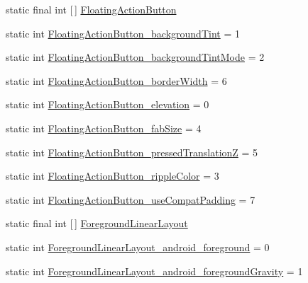 \begin{DoxyCompactItemize}
static final int \mbox{[}$\,$\mbox{]} \hyperlink{classandroid_1_1support_1_1v7_1_1mediarouter_1_1R_1_1styleable_ae665bad1758a0b708ec034929b76af91}{Floating\+Action\+Button}
\item 
static int \hyperlink{classandroid_1_1support_1_1v7_1_1mediarouter_1_1R_1_1styleable_aba6d8d43d6ae9315b2a7d8d808c39bdb}{Floating\+Action\+Button\+\_\+background\+Tint} = 1
\item 
static int \hyperlink{classandroid_1_1support_1_1v7_1_1mediarouter_1_1R_1_1styleable_a6dab3663758d5db831d0a3c6d4c3cfd0}{Floating\+Action\+Button\+\_\+background\+Tint\+Mode} = 2
\item 
static int \hyperlink{classandroid_1_1support_1_1v7_1_1mediarouter_1_1R_1_1styleable_a3062421234c87b23595c467fe125d6f8}{Floating\+Action\+Button\+\_\+border\+Width} = 6
\item 
static int \hyperlink{classandroid_1_1support_1_1v7_1_1mediarouter_1_1R_1_1styleable_a825fd6ef93b166b8df535e4b2bef49ba}{Floating\+Action\+Button\+\_\+elevation} = 0
\item 
static int \hyperlink{classandroid_1_1support_1_1v7_1_1mediarouter_1_1R_1_1styleable_abfd62dce09171db92b5473f46d12f11c}{Floating\+Action\+Button\+\_\+fab\+Size} = 4
\item 
static int \hyperlink{classandroid_1_1support_1_1v7_1_1mediarouter_1_1R_1_1styleable_aa52a7c21087dc6e360ad24e8b65e15ef}{Floating\+Action\+Button\+\_\+pressed\+TranslationZ} = 5
\item 
static int \hyperlink{classandroid_1_1support_1_1v7_1_1mediarouter_1_1R_1_1styleable_aa1f3b200711d78334f340170979ae709}{Floating\+Action\+Button\+\_\+ripple\+Color} = 3
\item 
static int \hyperlink{classandroid_1_1support_1_1v7_1_1mediarouter_1_1R_1_1styleable_ad73fa0b4b35d2b72943f9fd2e4122f9a}{Floating\+Action\+Button\+\_\+use\+Compat\+Padding} = 7
\item 
static final int \mbox{[}$\,$\mbox{]} \hyperlink{classandroid_1_1support_1_1v7_1_1mediarouter_1_1R_1_1styleable_a49fc131534b262fe1dc04e9f42f46d9b}{Foreground\+Linear\+Layout}
\item 
static int \hyperlink{classandroid_1_1support_1_1v7_1_1mediarouter_1_1R_1_1styleable_ab8851867a96c3cbe9b169e1c26ce1a76}{Foreground\+Linear\+Layout\+\_\+android\+\_\+foreground} = 0
\item 
static int \hyperlink{classandroid_1_1support_1_1v7_1_1mediarouter_1_1R_1_1styleable_a853dd75e050dc0c4b4fca83329d52f96}{Foreground\+Linear\+Layout\+\_\+android\+\_\+foreground\+Gravity} = 1

\end{DoxyCompactItemize}
